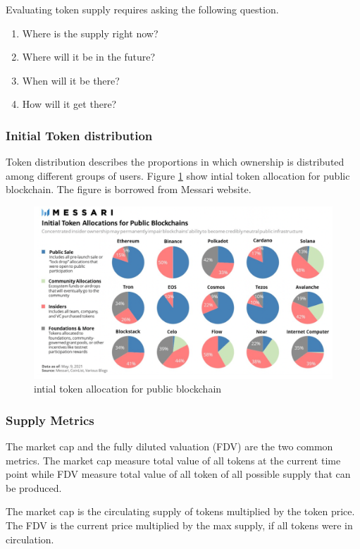 \documentclass{IEEEtran}
\begin{document}
Evaluating token supply requires asking the following question.
\begin{enumerate}
\item Where is the supply right now?
\item Where will it be in the future?
\item When will it be there?
\item How will it get there?
\end{enumerate}

\subsubsection{Initial Token distribution}
\label{sec:orgef69078}
Token distribution describes the proportions in which ownership is distributed among different groups of users. Figure \ref{intial_token_allocation_for_public_blockchain} show intial token allocation for public blockchain. The figure is borrowed from Messari website.

\begin{figure}[htbp]
\centering
\includegraphics[width=.9\linewidth]{./images/screenshot_20220504_231549.png}
\caption{\label{intial_token_allocation_for_public_blockchain}intial token allocation for public blockchain}
\end{figure}

\subsubsection{Supply Metrics}
\label{sec:org43578dd}
The market cap and the fully diluted valuation (FDV) are the two common metrics. The market cap measure total value of all tokens at the current time point while FDV measure total value of all token of all possible supply that can be produced.

The market cap is the circulating supply of tokens multiplied by the token price. The FDV is the current price multiplied by the max supply, if all tokens were in circulation.
\end{document}
